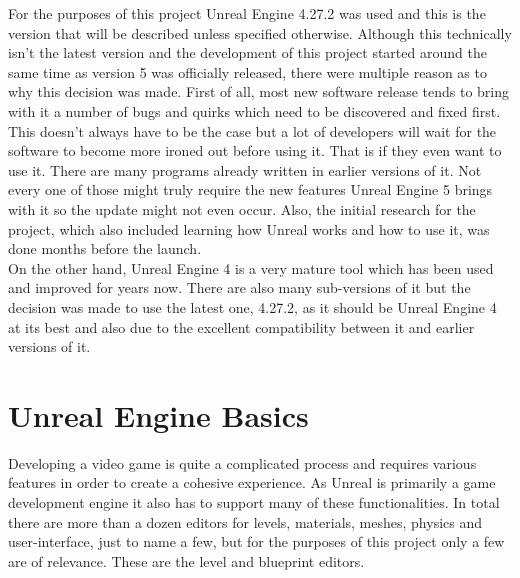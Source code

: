For the purposes of this project Unreal Engine 4.27.2 was used and this is the version that will be described unless specified otherwise. Although this technically isn't the latest version and the development of this project started around the same time as version 5 was officially released, there were multiple reason as to why this decision was made. First of all, most new software release tends to bring with it a number of bugs and quirks which need to be discovered and fixed first. This doesn't always have to be the case but a lot of developers will wait for the software to become more ironed out before using it. That is if they even want to use it. There are many programs already written in earlier versions of it. Not every one of those might truly require the new features Unreal Engine 5 brings with it so the update might not even occur. Also, the initial research for the project, which also included learning how Unreal works and how to use it, was done months before the launch.\\ 
On the other hand, Unreal Engine 4 is a very mature tool which has been used and improved for years now. There are also many sub-versions of it but the decision was made to use the latest one, 4.27.2, as it should be Unreal Engine 4 at its best and also due to the excellent compatibility between it and earlier versions of it.

\section{Unreal Engine Basics}\label{sec:Grundlage1}
Developing a video game is quite a complicated process and requires various features in order to create a cohesive experience. As Unreal is primarily a game development engine it also has to support many of these functionalities. In total there are more than a dozen editors for levels, materials, meshes, physics and user-interface\cite{bib:UEEditors}, just to name a few, but for the purposes of this project only a few are of relevance. These are the level and blueprint editors.\\

